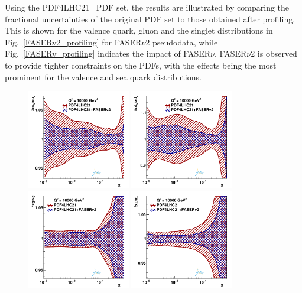\documentclass[11pt,a4paper]{article}
\numberwithin{equation}{section}
\numberwithin{figure}{section}
\numberwithin{table}{section}
\begin{document}
%
Using the PDF4LHC21~\cite{PDF4LHCWorkingGroup:2022cjn} PDF set, the results are illustrated by comparing the fractional uncertainties of the original PDF set to those obtained after profiling. 
This is shown for the valence quark, gluon and the singlet distributions in Fig.~\ref{FASERv2_profiling} for FASER$\nu$2 pseudodata, while Fig.~\ref{FASERv_profiling} indicates the impact of FASER$\nu$. FASER$\nu$2 is observed to provide tighter constraints on the PDFs, with the effects being the most prominent for the valence and sea quark distributions.

\begin{figure}[H]
\centering
\includegraphics[width=0.4\textwidth]{./figs_xFitter/FASERv2_q2_10000_pdf_uv_ratio.pdf}
\includegraphics[width=0.4\textwidth]{./figs_xFitter/FASERv2_q2_10000_pdf_dv_ratio.pdf}\\
\includegraphics[width=0.4\textwidth]{./figs_xFitter/FASERv2_q2_10000_pdf_g_ratio.pdf}
\includegraphics[width=0.4\textwidth]{./figs_xFitter/FASERv2_q2_10000_pdf_Sea_ratio.pdf}

\end{figure}
\end{document}
